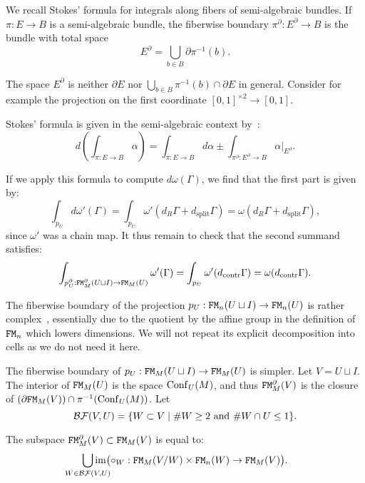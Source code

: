 We recall Stokes' formula for integrals along fibers of semi-algebraic bundles.
If $\pi : E \to B$ is a semi-algebraic bundle, the fiberwise boundary $\pi^{\partial} : E^{\partial} \to B$ is the bundle with total space
\[ E^{\partial} = \bigcup_{b \in B} \partial \pi^{-1}(b). \]

\begin{remark}
  The space $E^{\partial}$ is neither $\partial E$ nor $\bigcup_{b \in B} \pi^{-1}(b) \cap \partial E$ in general.
  Consider for example the projection on the first coordinate $[0,1]^{\times 2} \to [0,1]$.
\end{remark}

Stokes' formula is given in the semi-algebraic context by~\cite[Proposition 8.12]{HardtLambrechtsTurchinVolic2011}:
\[ d \left( \int_{\pi : E \to B} \alpha \right) = \int_{\pi : E \to B} d\alpha \pm \int_{\pi^{\partial} : E^{\partial} \to B} \alpha|_{E^{\partial}}. \]

If we apply this formula to compute $d \omega(\Gamma)$, we find that the first part is given by:
\begin{equation}
  \label{cnf.eq.int-d-omega}
  \int_{p_{U}} d \omega'(\Gamma) = \int_{p_{U}} \omega'(d_{R} \Gamma + d_{\mathrm{split}} \Gamma) = \omega(d_{R} \Gamma + d_{\mathrm{split}} \Gamma),
\end{equation}
since $\omega'$ was a chain map.
It thus remain to check that the second summand satisfies:
\[ \int_{p_{U}^{\partial} : \mathtt{FM}_{M}^{\partial}(U \sqcup I) \to \mathtt{FM}_{M}(U)} \omega'(\Gamma) = \int_{p_{U}} \omega'(d_{\mathrm{contr}} \Gamma) = \omega(d_{\mathrm{contr}} \Gamma). \]

The fiberwise boundary of the projection $p_{U} : \mathtt{FM}_{n}(U \sqcup I) \to \mathtt{FM}_{n}(U)$ is rather complex~\cite[Section 5.7]{LambrechtsVolic2014}, essentially due to the quotient by the affine group in the definition of $\mathtt{FM}_{n}$ which lowers dimensions.
We will not repeat its explicit decomposition into cells as we do not need it here.

The fiberwise boundary of $p_{U} : \mathtt{FM}_{M}(U \sqcup I) \to \mathtt{FM}_{M}(U)$ is simpler.
Let $V = U \sqcup I$.
The interior of $\mathtt{FM}_{M}(U)$ is the space $\operatorname{Conf}_{U}(M)$, and thus $\mathtt{FM}^{\partial}_{M}(V)$ is the closure of $(\partial \mathtt{FM}_{M}(V)) \cap \pi^{-1}(\operatorname{Conf}_{U}(M))$.
Let
\[ \mathcal{BF}(V,U) = \{ W \subset V \mid \# W \geq 2 \text{ and } \# W \cap U \leq 1 \}. \]

\begin{lemma}
  The subspace $\mathtt{FM}_{M}^{\partial}(V) \subset \mathtt{FM}_{M}(V)$ is equal to:
  \[ \smashoperator{\bigcup_{W \in \BF(V,U)}} \im \bigl( \circ_{W} : \FM_{M}(V/W) \times \FM_{n}(W) \to \FM_{M}(V) \bigr). \]
\end{lemma}

